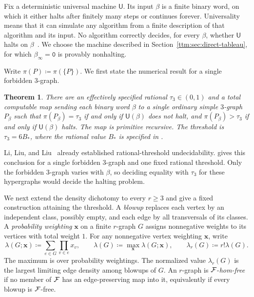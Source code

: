 \documentclass[10pt]{article}
\numberwithin{equation}{section}
\newtheorem{theorem}{Theorem}[section]
\theoremstyle{definition}
\newcommand{\x}{\boldsymbol{x}}\newcommand{\y}{\boldsymbol{y}}
\begin{document}
Fix a deterministic universal machine $\mathsf U$. Its input $\beta$ is a finite binary word, on which it either halts after finitely many steps or continues forever. Universality means that it can simulate any algorithm from a finite description of that algorithm and its input. No algorithm correctly decides, for every $\beta$, whether $\mathsf U$ halts on $\beta$~\cite{Turing1936,Rogers1967}. We choose the machine described in Section~\ref{ttm:sec:direct-tableau}, for which $\beta_\infty=\mathtt 0$ is provably nonhalting.

Write $\pi(P)\coloneqq\pi(\{P\})$. We first state the numerical result for a single forbidden $3$-graph.

\begin{theorem}\label{thm:singleton}
There are an effectively specified rational $\tau_3\in(0,1)$ and a total computable map sending each binary word $\beta$ to a single ordinary simple $3$-graph $P_\beta$ such that $\pi(P_\beta)=\tau_3$ if and only if $\mathsf U(\beta)$ does not halt, and $\pi(P_\beta)>\tau_3$ if and only if $\mathsf U(\beta)$ halts. The map is primitive recursive. The threshold is $\tau_3=6B_*$, where the rational value $B_*$ is specified in .
\end{theorem}
Li, Liu, and Liu~\cite[Theorem 1.2]{LiLiuLiu2026} already established rational-threshold undecidability.  gives this conclusion for a single forbidden $3$-graph and one fixed rational threshold. Only the forbidden $3$-graph varies with $\beta$, so deciding equality with $\tau_3$ for these hypergraphs would decide the halting problem.

We next extend the density dichotomy to every $r\ge3$ and give a fixed construction attaining the threshold. A \emph{blowup} replaces each vertex by an independent class, possibly empty, and each edge by all transversals of its classes. A \emph{probability weighting} $\x$ on a finite $r$-graph $G$ assigns nonnegative weights to its vertices with total weight $1$. For any nonnegative vertex weighting $\x$, write
\[
 \lambda(G;\x)\coloneqq\sum_{e\in G}\prod_{v\in e}x_v,
 \qquad \lambda(G)\coloneqq\max_{\x}\lambda(G;\x),
 \qquad \lambda_r(G)\coloneqq r!\lambda(G).
\]
The maximum is over probability weightings. The normalized value $\lambda_r(G)$ is the largest limiting edge density among blowups of $G$. An $r$-graph is $\mathcal F$-\emph{hom-free} if no member of $\mathcal F$ has an edge-preserving map into it, equivalently if every blowup is $\mathcal F$-free.
\end{document}
